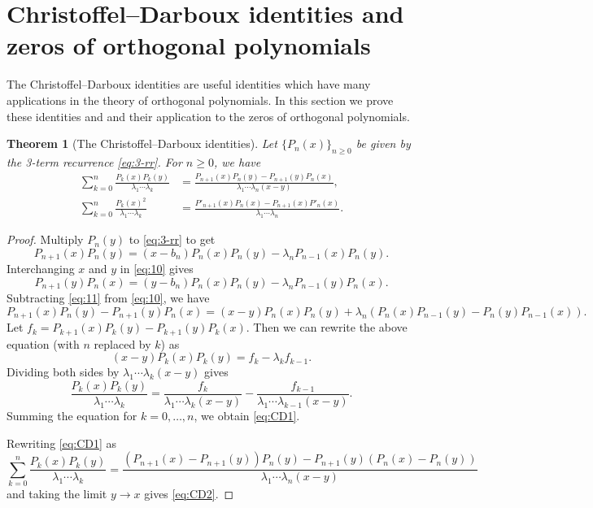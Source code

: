 \documentclass[oneside]{book}
\numberwithin{equation}{section}
\newtheorem{thm}{Theorem}[section]
\theoremstyle{definition}
\begin{document}
\section{Christoffel--Darboux identities
and zeros of orthogonal polynomials}

The Christoffel--Darboux identities are useful identities which have
many applications in the theory of orthogonal polynomials. In this
section we prove these identities and and their application to the
zeros of orthogonal polynomials.


\begin{thm}[The Christoffel--Darboux identities]
  Let \( \{ P_n(x) \}_{n\ge 0} \) be given by the 3-term recurrence
  \eqref{eq:3-rr}. For \( n\ge0 \), we have
\begin{align}
  \label{eq:CD1}
  \sum_{k=0}^{n} \frac{P_k(x)P_k(y)}{\lambda_1\cdots\lambda_k}
  &= \frac{P_{n+1}(x)P_{n}(y) - P_{n+1}(y)P_{n}(x)}{\lambda_1\cdots\lambda_{n}(x-y)}, \\
  \label{eq:CD2}
  \sum_{k=0}^{n} \frac{P_k(x)^2}{\lambda_1\cdots\lambda_k}
  &= \frac{P'_{n+1}(x)P_{n}(x) - P_{n+1}(x)P'_{n}(x)}{\lambda_1\cdots\lambda_{n}}.
\end{align}
\end{thm}
\begin{proof}
  Multiply \( P_n(y) \) to \eqref{eq:3-rr} to get
  \begin{equation}\label{eq:10}
    P_{n+1}(x) P_n(y) = (x-b_n) P_n(x) P_n(y) - \lambda_n P_{n-1}(x) P_n(y).
  \end{equation}
  Interchanging \( x \) and \( y \) in \eqref{eq:10} gives
  \begin{equation}\label{eq:11}
    P_{n+1}(y) P_n(x) = (y-b_n) P_n(x) P_n(y) - \lambda_n P_{n-1}(y) P_n(x).
  \end{equation}
  Subtracting \eqref{eq:11} from \eqref{eq:10}, we have
  \[
    P_{n+1}(x) P_n(y) - P_{n+1}(y) P_n(x) = (x-y) P_n(x) P_n(y)
    + \lambda_n (P_n(x)P_{n-1}(y) - P_n(y)P_{n-1}(x)).
  \]
  Let \( f_k = P_{k+1}(x)P_{k}(y) - P_{k+1}(y)P_{k}(x) \). Then we can
  rewrite the above equation (with \( n \) replaced by \( k \)) as
  \[
    (x-y) P_k(x)P_k(y) = f_{k} - \lambda_k f_{k-1}.
  \]
  Dividing both sides by \( \lambda_1\cdots\lambda_k(x-y) \) gives
  \[
    \frac{P_k(x)P_k(y)}{\lambda_1\cdots\lambda_k} =
    \frac{f_{k}}{\lambda_1\cdots\lambda_k(x-y)} -
    \frac{f_{k-1}}{\lambda_1\cdots\lambda_{k-1}(x-y)}.
  \]
  Summing the equation for \( k=0,\dots,n \), we obtain \eqref{eq:CD1}.

  Rewriting  \eqref{eq:CD1} as
  \[
  \sum_{k=0}^{n} \frac{P_k(x)P_k(y)}{\lambda_1\cdots\lambda_k}
    = \frac{(P_{n+1}(x)-P_{n+1}(y))P_{n}(y) -
      P_{n+1}(y)(P_{n}(x)-P_{n}(y))}{\lambda_1\cdots\lambda_{n}(x-y)}
  \]
  and taking the limit \( y\to x \) gives \eqref{eq:CD2}.
\end{proof}
\end{document}

